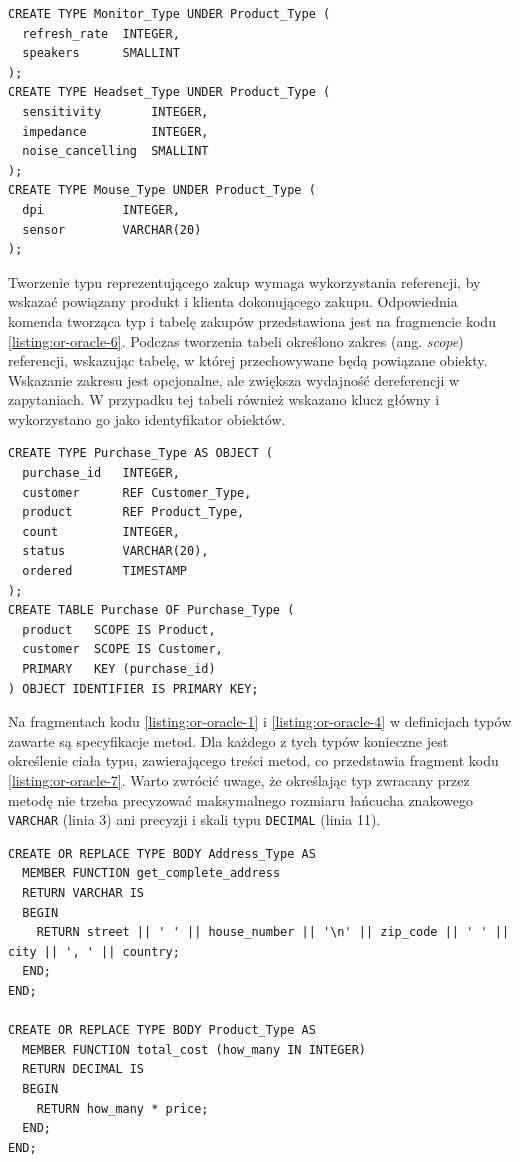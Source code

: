 \documentclass[a4paper,twoside,12pt]{book}
\begin{document}
\begin{lstlisting}[style=SQL, caption={Definicja podtypów produktu w Oracle.}, label={listing:or-oracle-5}, captionpos=b]
CREATE TYPE Monitor_Type UNDER Product_Type (
  refresh_rate  INTEGER,
  speakers      SMALLINT
);
CREATE TYPE Headset_Type UNDER Product_Type (
  sensitivity       INTEGER,
  impedance         INTEGER,
  noise_cancelling  SMALLINT
);
CREATE TYPE Mouse_Type UNDER Product_Type (
  dpi           INTEGER,
  sensor        VARCHAR(20)
);
\end{lstlisting}

Tworzenie typu reprezentującego zakup wymaga wykorzystania referencji, by wskazać powiązany produkt i klienta dokonującego zakupu. Odpowiednia komenda tworząca typ i tabelę zakupów przedstawiona jest na fragmencie kodu \ref{listing:or-oracle-6}. Podczas tworzenia tabeli określono zakres (ang. \textit{scope}) referencji, wskazując tabelę, w której przechowywane będą powiązane obiekty. Wskazanie zakresu jest opcjonalne, ale zwiększa wydajność dereferencji w zapytaniach. W przypadku tej tabeli również wskazano klucz główny i wykorzystano go jako identyfikator obiektów.

\begin{lstlisting}[style=SQL, caption={Definicja typu zakupu i tworzenie tabeli zakupów w Oracle.}, label={listing:or-oracle-6}, captionpos=b]
CREATE TYPE Purchase_Type AS OBJECT (
  purchase_id   INTEGER,
  customer      REF Customer_Type,
  product       REF Product_Type,
  count         INTEGER,
  status        VARCHAR(20),
  ordered       TIMESTAMP
);
CREATE TABLE Purchase OF Purchase_Type (
  product   SCOPE IS Product,
  customer  SCOPE IS Customer,
  PRIMARY   KEY (purchase_id)
) OBJECT IDENTIFIER IS PRIMARY KEY;
\end{lstlisting}

Na fragmentach kodu \ref{listing:or-oracle-1} i \ref{listing:or-oracle-4} w definicjach typów zawarte są specyfikacje metod. Dla każdego z tych typów konieczne jest określenie ciała typu, zawierającego treści metod, co przedstawia fragment kodu \ref{listing:or-oracle-7}. Warto zwrócić uwage, że określając typ zwracany przez metodę nie trzeba precyzować maksymalnego rozmiaru łańcucha znakowego \lstinline{VARCHAR} (linia 3) ani precyzji i skali typu \lstinline{DECIMAL} (linia 11).

\begin{lstlisting}[style=SQL, caption={Definicja ciał typów w Oracle.}, label={listing:or-oracle-7}, captionpos=b]
CREATE OR REPLACE TYPE BODY Address_Type AS 
  MEMBER FUNCTION get_complete_address 
  RETURN VARCHAR IS
  BEGIN
    RETURN street || ' ' || house_number || '\n' || zip_code || ' ' || city || ', ' || country;
  END;
END;

CREATE OR REPLACE TYPE BODY Product_Type AS 
  MEMBER FUNCTION total_cost (how_many IN INTEGER) 
  RETURN DECIMAL IS
  BEGIN
    RETURN how_many * price;
  END;
END;
\end{lstlisting}
\end{document}
